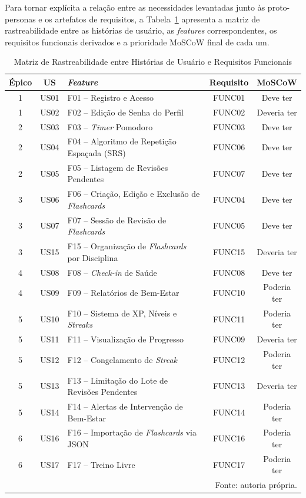 Para tornar explícita a relação entre as necessidades levantadas junto às proto-personas e os artefatos de requisitos, a Tabela~\ref{tab:rastreabilidade} apresenta a matriz de rastreabilidade entre as histórias de usuário, as \textit{features} correspondentes, os requisitos funcionais derivados e a prioridade MoSCoW final de cada um.

\begin{table}[H]
\centering
\caption{Matriz de Rastreabilidade entre Histórias de Usuário e Requisitos Funcionais}
\label{tab:rastreabilidade}
\begin{tabularx}{\textwidth}{|c|c|X|c|c|}
\hline
\textbf{Épico} & \textbf{US} & \textbf{\textit{Feature}} & \textbf{Requisito} & \textbf{MoSCoW} \\
\hline
1 & US01 & F01 -- Registro e Acesso & FUNC01 & Deve ter \\
\hline
1 & US02 & F02 -- Edição de Senha do Perfil & FUNC02 & Deveria ter \\
\hline
2 & US03 & F03 -- \textit{Timer} Pomodoro & FUNC03 & Deve ter \\
\hline
2 & US04 & F04 -- Algoritmo de Repetição Espaçada (SRS) & FUNC06 & Deve ter \\
\hline
2 & US05 & F05 -- Listagem de Revisões Pendentes & FUNC07 & Deve ter \\
\hline
3 & US06 & F06 -- Criação, Edição e Exclusão de \textit{Flashcards} & FUNC04 & Deve ter \\
\hline
3 & US07 & F07 -- Sessão de Revisão de \textit{Flashcards} & FUNC05 & Deve ter \\
\hline
3 & US15 & F15 -- Organização de \textit{Flashcards} por Disciplina & FUNC15 & Deveria ter \\
\hline
4 & US08 & F08 -- \textit{Check-in} de Saúde & FUNC08 & Deve ter \\
\hline
4 & US09 & F09 -- Relatórios de Bem-Estar & FUNC10 & Poderia ter \\
\hline
5 & US10 & F10 -- Sistema de XP, Níveis e \textit{Streaks} & FUNC11 & Poderia ter \\
\hline
5 & US11 & F11 -- Visualização de Progresso & FUNC09 & Deveria ter \\
\hline
5 & US12 & F12 -- Congelamento de \textit{Streak} & FUNC12 & Poderia ter \\
\hline
5 & US13 & F13 -- Limitação do Lote de Revisões Pendentes & FUNC13 & Deveria ter \\
\hline
5 & US14 & F14 -- Alertas de Intervenção de Bem-Estar & FUNC14 & Poderia ter \\
\hline
6 & US16 & F16 -- Importação de \textit{Flashcards} via JSON & FUNC16 & Poderia ter \\
\hline
6 & US17 & F17 -- Treino Livre & FUNC17 & Poderia ter \\
\hline
\multicolumn{5}{r}{\small Fonte: autoria própria.} \\
\end{tabularx}
\end{table}

